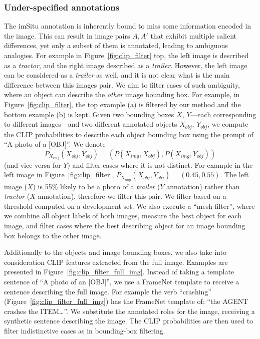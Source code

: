 \documentclass[letterpaper]{article} \usepackage{aaai23}  \usepackage{times}  \usepackage{helvet}  \usepackage{courier}  \usepackage[hyphens]{url}  \usepackage{graphicx} \urlstyle{rm} \def\UrlFont{\rm}  \usepackage{natbib}  \usepackage{caption} \frenchspacing  \setlength{\pdfpagewidth}{8.5in}  \setlength{\pdfpageheight}{11in}  \usepackage{algorithm}
\begin{document}
\subsubsection{Under-specified annotations}
The imSitu annotation is inherently bound to miss some information encoded in the image.
This can result in image pairs $A,A'$ that exhibit multiple salient differences, yet only a subset of them is annotated, leading to ambiguous analogies. For example in Figure~\ref{fig:clip_filter} top, the left image is described as a \emph{tractor}, and the right image described as a \emph{trailer}. However, the left image can be considered as a \emph{trailer} as well, and it is not clear what is the main difference between this images pair.
We aim to filter cases of such ambiguity, where an object can describe the \emph{other} image bounding box. For example, in Figure~\ref{fig:clip_filter}, the top example (a) is filtered by our method and the bottom example (b) is kept. 
Given two bounding boxes $X$, $Y$---each corresponding to different images---and two different annotated objects $X_{obj}$, $Y_{obj}$, we compute the CLIP \cite{radford2021learning} probabilities to describe each object bounding box using the prompt of ``A photo of a [OBJ]''. We denote  $$P_{X_{img}}(X_{obj},Y_{obj}) = (P(X_{img},X_{obj}), P(X_{img},Y_{obj}))$$ (and vice-versa for $Y$) and filter cases where it is not distinct. For example in the left image in Figure~\ref{fig:clip_filter}, $P_{X_{img}}(X_{obj},Y_{obj}) = (0.45, 0.55)$. The left image ($X$) is 55\% likely to be a photo of a \emph{trailer} ($Y$ annotation) rather than \emph{tractor} ($X$ annotation), therefore we filter this pair. We filter based on a threshold computed on a development set. We also execute a ``mesh filter'', where we combine all object labels of both images, measure the best object for each image, and filter cases where the best describing object for an image bounding box belongs to the other image. 

Additionally to the objects and image bounding boxes, we  also take into consideration CLIP features extracted from the full image. Examples are presented in Figure~\ref{fig:clip_filter_full_img}. Instead of taking a template sentence of ``A photo of an [OBJ]'', we use a FrameNet template \cite{fillmore2003background} to receive a sentence describing the full image. For example the verb ``crashing'' (Figure~\ref{fig:clip_filter_full_img}) has the FrameNet template of: ``the AGENT crashes the ITEM\dots''. We substitute the annotated roles for the image, receiving a synthetic sentence describing the image. The CLIP probabilities are then used to filter indistinctive cases as in bounding-box filtering.
\end{document}
